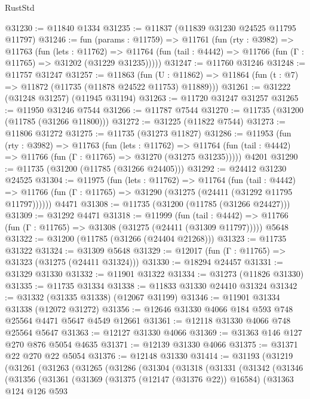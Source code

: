 \begin{lexlean}{RustStd}
\begin{coremodule}
@31230 := @11840 @1334
@31235 := @11837 (@11839 @31230 @24525 @11795 @11797)
@31246 := fun (params : @11759) =>
  @11761
    (fun (rty : @3982) =>
    @11763
      (fun (lets : @11762) =>
      @11764 (fun (tail : @4442) => @11766 (fun (Γ : @11765) => @31202 (@31229 @31235)))))
@31247 := @11760 @31246
@31248 := @11757 @31247
@31257 := @11863
    (fun (U : @11862) => @11864 (fun (t : @7) => @11872 (@11735 (@11878 @24522 @11753) @11889)))
@31261 := @31222 (@31248 @31257) (@11945 @31194)
@31263 := @11720 @31247 @31257
@31265 := @11950 @31246 @7544
@31266 := @11787 @7544
@31270 := @11735 (@31200 (@11785 (@31266 @11800)))
@31272 := @31225 (@11822 @7544)
@31273 := @11806 @31272
@31275 := @11735 (@31273 @11827)
@31286 := @11953
    (fun (rty : @3982) =>
    @11763
      (fun (lets : @11762) =>
      @11764 (fun (tail : @4442) => @11766 (fun (Γ : @11765) => @31270 (@31275 @31235)))))
    @4201
@31290 := @11735 (@31200 (@11785 (@31266 @24405)))
@31292 := @24412 @31230 @24525
@31304 := @11975
    (fun (lets : @11762) =>
    @11764
      (fun (tail : @4442) =>
      @11766 (fun (Γ : @11765) => @31290 (@31275 (@24411 (@31292 @11795 @11797))))))
    @4471
@31308 := @11735 (@31200 (@11785 (@31266 @24427)))
@31309 := @31292 @4471
@31318 := @11999
    (fun (tail : @4442) => @11766 (fun (Γ : @11765) => @31308 (@31275 (@24411 (@31309 @11797)))))
    @5648
@31322 := @31200 (@11785 (@31266 (@24404 @21268)))
@31323 := @11735 @31322
@31324 := @31309 @5648
@31329 := @12017 (fun (Γ : @11765) => @31323 (@31275 (@24411 @31324)))
@31330 := @18294 @24457
@31331 := @31329 @31330
@31332 := @11901 @31322
@31334 := @31273 (@11826 @31330)
@31335 := @11735 @31334
@31338 := @11833 @31330 @24410 @31324
@31342 := @31332 (@31335 @31338) (@12067 @31199)
@31346 := @11901 @31334 @31338 (@12072 @31272)
@31356 := @12646 @31330 @4066 @184 @593 @748 @25564 @4471 @5647 @4549 @12661
@31361 := @12118 @31330 @4066 @748 @25564 @5647
@31363 := @12127 @31330 @4066
@31369 := @31363 @146 @127 @270 @876 @5054 @4635
@31371 := @12139 @31330 @4066
@31375 := @31371 @22 @270 @22 @5054
@31376 := @12148 @31330
@31414 := @31193
    (@31219
      (@31261
        (@31263
          (@31265
            (@31286
              (@31304
                (@31318
                  (@31331
                    (@31342
                      (@31346
                        (@31356
                          (@31361
                            (@31369
                              (@31375 (@12147 (@31376 @22)) @16584)
                              (@31363
                                @124
                                @126
                                @593

\end{coremodule}
\end{lexlean}
